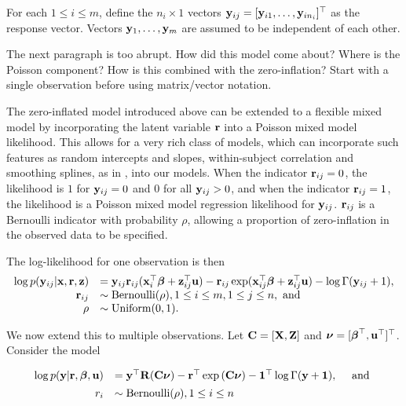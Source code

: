 \documentclass{amsart}[12pt]
\newcommand{\joc}[1]{{\color{red}#1}}
\begin{document}
For each $1 \leq i \leq m$, define the $n_i \times 1$ vectors ${\bf y}_{ij} = [{\bf y}_{i 1}, \ldots, {\bf y}_{i
n_i}]^\top$ as the response vector. Vectors ${\bf y}_1, \ldots, {\bf y}_m$ are assumed to be independent of each other.

\joc{The next paragraph is too abrupt. How did this model come about? Where is the Poisson component? How is this combined with the zero-inflation?
Start with a single observation before using matrix/vector notation.}

The zero-inflated model introduced above can be extended to a flexible mixed model by incorporating the latent
variable ${\bf r}$ into a Poisson mixed model likelihood. This allows for a very rich class of models, which can
incorporate such features as random intercepts and slopes, within-subject correlation and smoothing splines,
as in \citep{Wand2008}, into our models. When the indicator ${\bf r}_{ij} = 0$, the likelihood is $1$ for
${\bf y}_{ij} = 0$ and $0$ for all ${\bf y}_{ij} > 0$, and when the indicator ${\bf r}_{ij} = 1$, the likelihood is a
Poisson mixed model regression likelihood for ${\bf y}_{ij}$. ${\bf r}_{ij}$ is a Bernoulli indicator with probability
$\rho$, allowing a proportion of zero-inflation in the observed data to be specified.

The log-likelihood for one observation is then
\[
	\begin{array}{rl}
		\log p({\bf y}_{ij} | {\bf x}, {\bf r}, {\bf z}) & = {\bf y}_{ij} {\bf r}_{ij} ({\bf x}_i^\top {\boldsymbol\beta} + {\bf z}_{ij}^\top {\bf u}) - {\bf r}_{ij} \exp ({\bf x}_{ij}^\top {\boldsymbol\beta} + {\bf z}_{ij}^\top {\bf u}) - \log \Gamma ({\bf y}_{ij} + 1), \\
		{\bf r}_{ij}                         & \sim \text{Bernoulli}(\rho), 1 \leq i \leq m, 1 \leq j \leq n, \text{ and }                                                              \\
		\rho                        & \sim \mbox{Uniform}(0, 1).                                                                                              \\
	\end{array}
\]

\noindent We now extend this to multiple observations. Let ${\bf C} = [{\bf X}, {\bf Z}]$ and ${\boldsymbol \nu} = [{\boldsymbol \beta}^\top, {\bf u}^\top]^\top$. Consider the model

\begin{equation}\label{eq:main}
	\begin{array}{rl}
		\log{p({\bf y}|{\bf r}, {\boldsymbol\beta}, {\bf u})} & = {\bf y}^\top {\bf R} ({\bf C}{\boldsymbol \nu}) - {\bf r}^\top \exp{({\bf C}{\boldsymbol\nu})} - {\bf 1}^\top \log{\Gamma{({\bf y}+ {\bf1})}}, \quad \mbox{ and } \\ [1ex]
		r_i                           & \sim \text{Bernoulli}(\rho), 1 \leq i \leq n                                                                     \\
	\end{array}
\end{equation}
\end{document}
